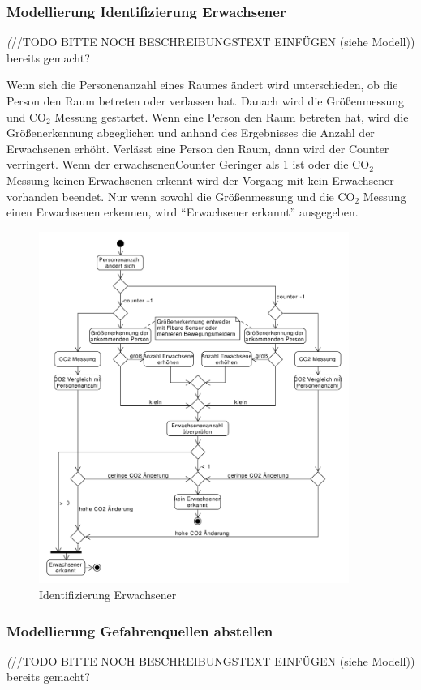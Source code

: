 \subsubsection{Modellierung Identifizierung Erwachsener}
\emph(//TODO BITTE NOCH BESCHREIBUNGSTEXT EINFÜGEN (siehe Modell)) bereits gemacht?

Wenn sich die Personenanzahl eines Raumes ändert wird unterschieden, ob die Person den Raum betreten oder verlassen hat. Danach wird die Größenmessung und CO$_2$ Messung gestartet. Wenn eine Person den Raum betreten hat, wird die Größenerkennung abgeglichen und anhand des Ergebnisses die Anzahl der Erwachsenen erhöht. Verlässt eine Person den Raum, dann wird der Counter verringert. Wenn der erwachsenenCounter Geringer als 1 ist oder die CO$_2$ Messung keinen Erwachsenen erkennt wird der Vorgang mit kein Erwachsener vorhanden beendet. Nur wenn sowohl die Größenmessung und die CO$_2$ Messung einen Erwachsenen erkennen, wird "`Erwachsener erkannt"' ausgegeben.
\begin{figure}[h!]
	\centering
	\includegraphics[width=0.9\textwidth]{img/Szenarien/IdentifizierungErwachsene.pdf}
	\caption{Identifizierung Erwachsener}
	\label{fig:szenarienIdentifizierungErwachsene}
\end{figure}

\subsubsection{Modellierung Gefahrenquellen abstellen}
\emph(//TODO BITTE NOCH BESCHREIBUNGSTEXT EINFÜGEN (siehe Modell)) bereits gemacht?

